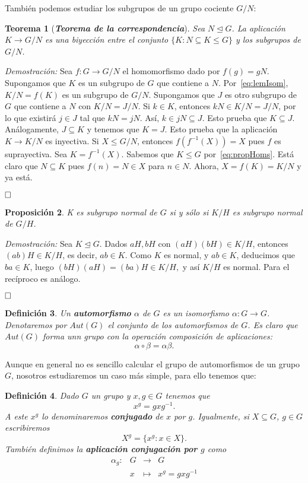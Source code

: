 \documentclass[12pt]{article}
\newtheorem{theorem}{Teorema}[section]
\newtheorem{proposition}[theorem]{Proposición}
\newtheorem{definition}[theorem]{Definición}
\begin{document}
También podemos estudiar los subgrupos de un grupo cociente $G/N$:

\begin{theorem}[\textbf{\textit{Teorema de la correspondencia}}]
Sea $N \unlhd G$. La aplicación $K \longrightarrow G/N$ es una biyección entre el conjunto $\lbrace K: N \subseteq K \leq G \rbrace$ y los subgrupos de $G/N$.
\end{theorem}
\emph{Demostración: }Sea $f \colon G \longrightarrow G/N$ el homomorfismo dado por $f(g) = gN$. Supongamos que $K$ es un subgrupo de $G$ que contiene a $N$. Por~\ref{eq:lemIsom}, $K/N = f(K)$ es un subgrupo de $G/N$. Supongamos que $J$ es otro subgrupo de $G$ que contiene a $N$ con $K/N = J/N$. Si $k \in K$, entonces $kN \in K/N = J/N$, por lo que existirá $j \in J$ tal que $kN = jN$. Así, $k \in jN \subseteq J$. Esto prueba que $K \subseteq J$. Análogamente, $J \subseteq K$ y tenemos que $K=J$. Esto prueba que la aplicación $K \longrightarrow K/N$ es inyectiva. Si $X \leq G/N$, entonces $f(f^{-1}(X)) = X$ pues $f$ es suprayectiva. Sea $K = f^{-1}(X)$. Sabemos que $K \leq G$ por~\ref{eq:propHoms}. Está claro que $N \subseteq K$ pues $f(n) = N \in X$ para $n \in N$. Ahora, $X=f(K) = K/N$ y ya está.

$\hfill \square$

\begin{proposition}\label{eq:ej32} K es subgrupo normal de $G$ si y sólo si $K/H$ es subgrupo normal de $G/H$.\end{proposition}

\emph{Demostración: }Sea $K \unlhd G$. Dados $aH, bH$ con $(aH)(bH) \in K/H$, entonces $(ab)H \in K/H$, es decir, $ab \in K$. Como $K$ es normal, y $ab \in K$, deducimos que $ba \in K$, luego $(bH)(aH) = (ba)H \in K/H,$ y así $K/H$ es normal. Para el recíproco es análogo.

$\hfill \square$

\begin{definition}Un \textbf{automorfismo} $\alpha$ de $G$ es un isomorfismo $\alpha \colon G \longrightarrow G$. Denotaremos por $Aut(G)$ el conjunto de los automorfismos de $G$. Es claro que $Aut(G)$ forma unn grupo con la operación composición de aplicaciones: $$\alpha \circ \beta = \alpha \beta.$$
\end{definition}

Aunque en general no es sencillo calcular el grupo de automorfismos de un grupo $G$, nosotros estudiaremos un caso más simple, para ello tenemos que:

\begin{definition} Dado $G$ un grupo y $x,g \in G$ tenemos que $$x^g=gxg^{-1}.$$ A este $x^g$ lo denominaremos \textbf{conjugado} de $x$ por $g$. Igualmente, si $X \subseteq G$, $g \in G$ escribiremos $$X^g = \lbrace x^g:x \in X \rbrace.$$ También definimos la \textbf{aplicación conjugación por $g$} como $$\begin{array}{rccl}
\alpha_g \colon &G&\longrightarrow &G \\
&x& \longmapsto &x^g = gxg^{-1}
\end{array}
$$
\end{definition}
\end{document}
